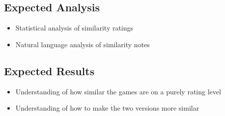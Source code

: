 \documentclass[12pt, a4paper]{report}
\begin{document}
\subsection{Expected Analysis}
\begin{itemize}
  \item Statistical analysis of similarity ratings
  \item Natural language analysis of similarity notes
\end{itemize}

\subsection{Expected Results}
\begin{itemize}
  \item Understanding of how similar the games are on a purely rating level
  \item Understanding of how to make the two versions more similar
\end{itemize}
\end{document}
